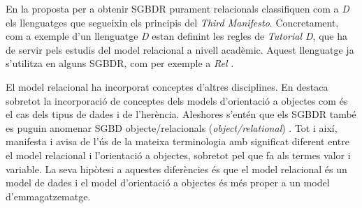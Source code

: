 En la proposta per a obtenir SGBDR purament relacionals
\textcite{date06:_datab_types_relat_model,date:tutoriald} classifiquen
com a \emph{D} els llenguatges que segueixin els principis del
\emph{Third Manifesto}. Concretament, com a exemple d'un llenguatge
\emph{D} estan definint les regles de \emph{Tutorial D}, que ha de
servir pels estudis del model relacional a nivell acadèmic. Aquest
llenguatge ja s'utilitza en alguns SGBDR, com per exemple a
\emph{Rel} \parencite{rel}.


El model relacional ha incorporat conceptes d'altres disciplines. En
destaca sobretot la incorporació de conceptes dels models d'orientació
a objectes com és el cas dels tipus de dades i de l'herència.
Aleshores s'entén que els SGBDR també es puguin anomenar SGBD
objecte/relacionals (\emph{object/relational})
\parencite{date02:foundation}.  Tot i així, \textcite[cap.~6]{date06}
manifesta i avisa de l'ús de la mateixa terminologia amb significat
diferent entre el model relacional i l'orientació a objectes, sobretot
pel que fa als termes valor i variable. %
La seva hipòtesi a aquestes diferències és que el model relacional és
un model de dades i el model d'orientació a objectes és més proper a
un model
d'emmagatzematge. %




